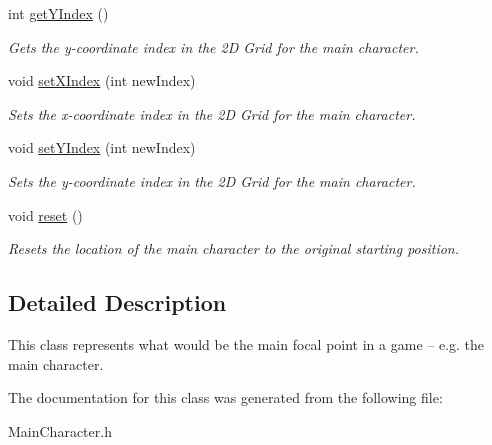 \begin{DoxyCompactItemize}
\mbox{\label{class_main_character_ab1eea5535c106a959e4b407db872d6ec}} 
int \mbox{\hyperlink{class_main_character_ab1eea5535c106a959e4b407db872d6ec}{get\+Y\+Index}} ()
\begin{DoxyCompactList}\small\item\em Gets the y-\/coordinate index in the 2D Grid for the main character. \end{DoxyCompactList}\item 
\mbox{\label{class_main_character_ae56017ce60e197435cbd0a928876a901}} 
void \mbox{\hyperlink{class_main_character_ae56017ce60e197435cbd0a928876a901}{set\+X\+Index}} (int new\+Index)
\begin{DoxyCompactList}\small\item\em Sets the x-\/coordinate index in the 2D Grid for the main character. \end{DoxyCompactList}\item 
\mbox{\label{class_main_character_aabe74b914d41293a235dfc1be3a36470}} 
void \mbox{\hyperlink{class_main_character_aabe74b914d41293a235dfc1be3a36470}{set\+Y\+Index}} (int new\+Index)
\begin{DoxyCompactList}\small\item\em Sets the y-\/coordinate index in the 2D Grid for the main character. \end{DoxyCompactList}\item 
\mbox{\label{class_main_character_a5f57b318af6b7919ad7594603a35750c}} 
void \mbox{\hyperlink{class_main_character_a5f57b318af6b7919ad7594603a35750c}{reset}} ()
\begin{DoxyCompactList}\small\item\em Resets the location of the main character to the original starting position. \end{DoxyCompactList}\end{DoxyCompactItemize}


\subsection{Detailed Description}
This class represents what would be the main focal point in a game -- e.\+g. the main character. 

The documentation for this class was generated from the following file\+:\begin{DoxyCompactItemize}
\item 
Main\+Character.\+h\end{DoxyCompactItemize}
